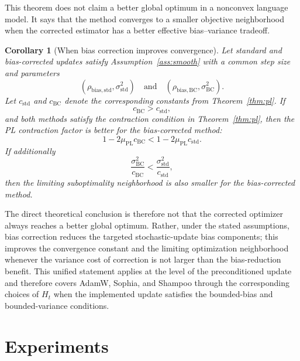 \documentclass{article}
\newtheorem{corollary}{Corollary}
\begin{document}
This theorem does not claim a better global optimum in a nonconvex language model. It says that the method converges to a smaller objective neighborhood when the corrected estimator has a better effective bias--variance tradeoff.

\begin{corollary}[When bias correction improves convergence]
\label{cor:bc-better}
Let standard and bias-corrected updates satisfy Assumption~\ref{ass:smooth} with a common step size and parameters
\begin{equation}
    (\rho_{\mathrm{bias},\mathrm{std}},\sigma_{\mathrm{std}}^2)
    \quad\text{and}\quad
    (\rho_{\mathrm{bias},\mathrm{BC}},\sigma_{\mathrm{BC}}^2).
\end{equation}
Let $c_{\mathrm{std}}$ and $c_{\mathrm{BC}}$ denote the corresponding constants from Theorem~\ref{thm:pl}. If
\begin{equation}
    c_{\mathrm{BC}}>c_{\mathrm{std}},
\end{equation}
and both methods satisfy the contraction condition in Theorem~\ref{thm:pl}, then the PL contraction factor is better for the bias-corrected method:
\begin{equation}
    1-2\mu_{\mathrm{PL}}c_{\mathrm{BC}}
    <
    1-2\mu_{\mathrm{PL}}c_{\mathrm{std}}.
\end{equation}
If additionally
\begin{equation}
    \frac{\sigma_{\mathrm{BC}}^2}{c_{\mathrm{BC}}}
    <
    \frac{\sigma_{\mathrm{std}}^2}{c_{\mathrm{std}}},
\end{equation}
then the limiting suboptimality neighborhood is also smaller for the bias-corrected method.
\end{corollary}

The direct theoretical conclusion is therefore not that the corrected optimizer always reaches a better global optimum. Rather, under the stated assumptions, bias correction reduces the targeted stochastic-update bias components; this improves the convergence constant and the limiting optimization neighborhood whenever the variance cost of correction is not larger than the bias-reduction benefit. This unified statement applies at the level of the preconditioned update and therefore covers AdamW, Sophia, and Shampoo through the corresponding choices of $H_t$ when the implemented update satisfies the bounded-bias and bounded-variance conditions.



\section{Experiments}
\label{sec:experiments}
\end{document}
